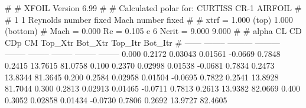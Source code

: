 #  
#       XFOIL         Version 6.99
#  
# Calculated polar for: CURTISS CR-1 AIRFOIL                            
#  
# 1 1 Reynolds number fixed          Mach number fixed         
#  
# xtrf =   1.000 (top)        1.000 (bottom)  
# Mach =   0.000     Re =     0.105 e 6     Ncrit =   9.000  9.000
#  
#   alpha    CL        CD       CDp       CM     Top_Xtr  Bot_Xtr  Top_Itr  Bot_Itr
#  ------ -------- --------- --------- -------- -------- -------- -------- --------
   0.000   0.2172   0.03043   0.01561  -0.0669   0.7848   0.2415  13.7615  81.0758
   0.100   0.2370   0.02998   0.01538  -0.0681   0.7834   0.2473  13.8344  81.3645
   0.200   0.2584   0.02958   0.01504  -0.0695   0.7822   0.2541  13.8928  81.7044
   0.300   0.2813   0.02913   0.01465  -0.0711   0.7813   0.2613  13.9382  82.0669
   0.400   0.3052   0.02858   0.01434  -0.0730   0.7806   0.2692  13.9727  82.4605
